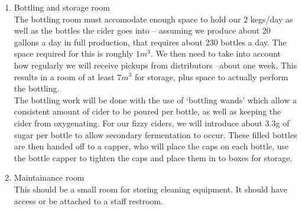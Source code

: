\documentclass[11pt]{article}
\begin{document}
\begin{enumerate}
  \item Bottling and storage room \\
  The bottling room must accomodate enough space to hold our 2 kegs/day as well as the bottles the cider goes into -- assuming we produce about 20 gallons a day in full production, that requires about 230 bottles a day. The space required for this is roughly $1m^3$. We then need to take into account how regularly we will receive pickups from distributors --about one week. This results in a room of at least $7m^3$ for storage, plus space to actually perform the bottling. \\
The bottling work will be done with the use of `bottling wands' which allow a consistent amount of cider to be poured per bottle, as well as keeping the cider from oxygenating. For our fizzy ciders, we will introduce about 3.3g of sugar per bottle to allow secondary fermentation to occur. These filled bottles are then handed off to a capper, who will place the caps on each bottle, use the bottle capper to tighten the caps and place them in to boxes for storage.

  \item Maintainance room\\
  This should be a small room for storing cleaning equipment. It should have access or be attached to a staff restroom.
  \end{enumerate}
\end{document}
